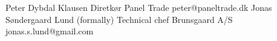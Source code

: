 %
%
%


\begin{referees}

		{Peter Dybdal Klausen}
		{Diretkør}
		{Panel Trade}
		{peter@paneltrade.dk}
        {}
		{Jonas Søndergaard Lund}
		{(formally) Technical chef}
		{Brunsgaard A/S}
		{jonas.s.lund@gmail.com}
		{}
\end{referees}